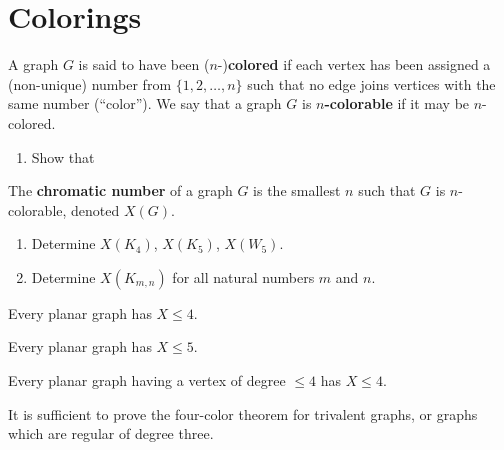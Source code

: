 \section{Colorings}\label{sec:colorings}

\begin{definition} A graph $G$ is said to have been ($n$-)\textbf{colored} if each vertex has been assigned a (non-unique) number from $\{1, 2, \ldots, n\}$ such that no edge joins vertices with the same number (``color'').  We say that a graph $G$ is \textbf{$n$-colorable} if it may be $n$-colored.
\end{definition}

\begin{examples}\leavevmode
\begin{enumerate}
    \item Show that
\end{enumerate}
\end{examples}

\begin{definition} The \textbf{chromatic number} of a graph $G$ is the smallest $n$ such that $G$ is $n$-colorable, denoted $X(G)$.
\end{definition}

\begin{examples}\leavevmode
\begin{enumerate}
    \item Determine $X(K_4)$, $X(K_5)$, $X(W_5)$.
    \item Determine $X(K_{m,n})$ for all natural numbers $m$ and $n$.
\end{enumerate}
\end{examples}

\begin{theorem} Every planar graph has $X \leq 4$.
\end{theorem}

\begin{theorem} Every planar graph has $X \leq 5$.
\end{theorem}

\begin{claim} Every planar graph having a vertex of degree $\leq 4$ has $X\leq 4$.
\end{claim}

\begin{theorem} It is sufficient to prove the four-color theorem for trivalent graphs, or graphs which are regular of degree three.
\end{theorem}

